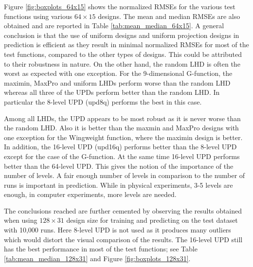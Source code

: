 \documentclass [PhD] {package/uclathes}
\begin{document}
Figure \ref{fig:boxplots_64x15} shows the normalized RMSEs for the various test functions using various $64\times15$ designs. The mean and median RMSEs are also obtained and are reported in Table \ref{tab:mean_median_64x15}.
A general conclusion is that the use of uniform designs and uniform projection designs in prediction is efficient as they result in minimal normalized RMSEs for most of the test functions, compared to the other types of designs. This could be attributed to their robustness in nature. On the other hand, the random LHD is often the worst as expected with one exception. For the 9-dimensional G-function, the maximin, MaxPro and uniform LHDs perform worse than the random LHD whereas all three of the UPDs perform better than the random LHD. In particular the 8-level UPD  (upd8q) performs the best in this case.

Among all LHDs, the UPD appears to be most robust as it is never worse than the random LHD. Also it is better than the maxmin and  MaxPro designs with one exception for the Wingweight function, where the maximin design is better. In addition, the 16-level UPD (upd16q) performs better than the 8-level UPD except for the case of the G-function. At the same time 16-level UPD performs better than the 64-level UPD. This gives the notion of the importance of the number of levels. A fair enough number of levels in comparison to the number of runs is important in prediction. While in physical experiments, 3-5 levels are enough, in computer experiments, more levels are needed.

The conclusions reached are further cemented by observing the results obtained when using $128\times 31$ design size for training and predicting on the test dataset with 10,000 runs. Here 8-level UPD is not used as it produces many outliers which would distort the visual comparison of the results. The 16-level UPD still has the best performance in most of the test functions; see Table \ref{tab:mean_median_128x31} and Figure \ref{fig:boxplots_128x31}.
\end{document}
